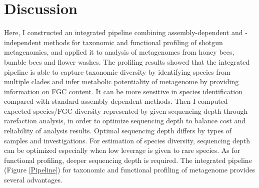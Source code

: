 \documentclass[11pt]{article}
\begin{document}
\section{Discussion}
Here, I constructed an integrated pipeline combining assembly-dependent and -independent methods for taxonomic and functional profiling of shotgun metagenomics, and applied it to analysis of metagenomes from honey bees, bumble bees and flower washes. 
The profiling results showed that the integrated pipeline is able to capture taxonomic diversity by identifying species from multiple clades and infer metabolic potentiality of metagenome by providing information on FGC content. 
It can be more sensitive in species identification compared with standard assembly-dependent methods. 
Then I computed expected species/FGC diversity represented by given sequencing depth through rarefaction analysis, in order to optimize sequencing depth to balance cost and reliability of analysis results. 
Optimal sequencing depth differs by types of samples and investigations. 
For estimation of species diversity, sequencing depth can be optimized especially when low leverage is given to rare species. 
As for functional profiling, deeper sequencing depth is required.  
\newline
The integrated pipeline (Figure \ref{Pipeline}) for taxonomic and functional profiling of metagenome provides several advantages. 
\end{document}
